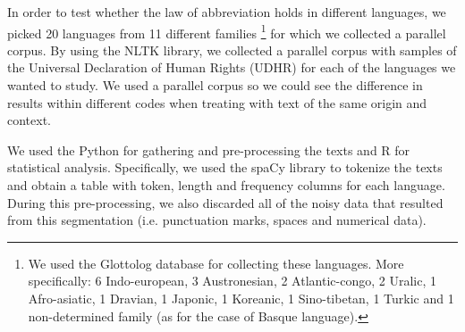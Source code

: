 In order to test whether the law of abbreviation holds in different languages, we picked 20 languages from 11 different families \footnote{We used the Glottolog database \cite{Glottolog} for collecting these languages. More specifically: 6 Indo-european, 3 Austronesian, 2 Atlantic-congo, 2 Uralic, 1 Afro-asiatic, 1 Dravian, 1 Japonic, 1 Koreanic, 1 Sino-tibetan, 1 Turkic and 1 non-determined family (as for the case of Basque language).} for which we collected a parallel corpus.  By using the NLTK library, we collected a parallel corpus with samples of the Universal Declaration of Human Rights (UDHR) for each of the languages we wanted to study. We used a parallel corpus so we could see the difference in results within different codes when treating with text of the same origin and context. 

\newpage
We used the Python for gathering and pre-processing the texts and R for statistical analysis. Specifically, we used the spaCy library to tokenize the texts and obtain a table with token, length and frequency columns for each language. During this pre-processing, we also discarded all of the noisy data that resulted from this segmentation (i.e. punctuation marks, spaces and numerical data).
